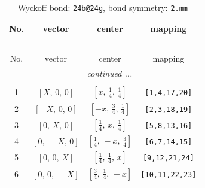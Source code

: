 \documentclass[fleqn,8pt]{jsarticle}
\begin{document}
\renewcommand{\arraystretch}{1.2}
\begin{longtable}{cccc}
\caption{Wyckoff bond: {\tt 24b@24g}, bond symmetry: {\tt 2.mm}}
 \\
 \hline \hline
No. & vector & center & mapping \\ \hline \endfirsthead

\multicolumn{3}{l}{\tablename\ \thetable{}} \\
 \hline \hline
No. & vector & center & mapping \\ \hline \endhead

 \hline \hline
\multicolumn{3}{r}{\footnotesize\it continued ...} \\ \endfoot

 \hline \hline
\multicolumn{3}{r}{} \\ \endlastfoot

1 & $\left[ X,\, 0,\, 0 \right]$ & $\left[ x,\, \frac{1}{4},\, \frac{1}{4} \right]$ & {\tt [1,4,17,20]} \\ \hline
2 & $\left[ - X,\, 0,\, 0 \right]$ & $\left[ - x,\, \frac{3}{4},\, \frac{1}{4} \right]$ & {\tt [2,3,18,19]} \\ \hline
3 & $\left[ 0,\, X,\, 0 \right]$ & $\left[ \frac{1}{4},\, x,\, \frac{1}{4} \right]$ & {\tt [5,8,13,16]} \\ \hline
4 & $\left[ 0,\, - X,\, 0 \right]$ & $\left[ \frac{1}{4},\, - x,\, \frac{3}{4} \right]$ & {\tt [6,7,14,15]} \\ \hline
5 & $\left[ 0,\, 0,\, X \right]$ & $\left[ \frac{1}{4},\, \frac{1}{4},\, x \right]$ & {\tt [9,12,21,24]} \\ \hline
6 & $\left[ 0,\, 0,\, - X \right]$ & $\left[ \frac{3}{4},\, \frac{1}{4},\, - x \right]$ & {\tt [10,11,22,23]} \\
\end{longtable}
\renewcommand{\arraystretch}{1.2}
\end{document}
